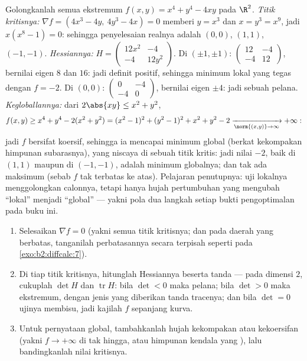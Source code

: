 \begin{example}\label{ex:b2:diffcalc:quarticrun}
Golongkanlah semua ekstremum $f(x, y) = x^4 + y^4 - 4xy$ pada $\R^2$.
\emph{Titik kritisnya:} $\nabla f = (4x^3 - 4y,\ 4y^3 - 4x) =
0$ memberi $y = x^3$ dan $x = y^3 = x^9$, jadi $x(x^8 - 1) = 0$:
sehingga penyelesaian realnya adalah $(0,0)$, $(1,1)$, $(-1,-1)$.
\emph{Hessiannya:} $H = \begin{pmatrix} 12x^2 & -4\\ -4 &
12y^2\end{pmatrix}$. Di $(\pm1, \pm1)$: $\begin{pmatrix} 12 &
-4\\ -4 & 12\end{pmatrix}$, bernilai eigen $8$ dan $16$: jadi
definit positif, sehingga minimum lokal yang tegas dengan $f = -2$. Di $(0,0)$:
$\begin{pmatrix} 0 & -4\\ -4 & 0\end{pmatrix}$, bernilai eigen
$\pm4$: jadi sebuah pelana. \emph{Kegloballannya:} dari $2\abs{xy} \leq x^2 +
y^2$,
\[
f(x, y) \geq x^4 + y^4 - 2(x^2 + y^2)
= (x^2 - 1)^2 + (y^2 - 1)^2 + x^2 + y^2 - 2
\xrightarrow[\norm{(x,y)}\to\infty]{} +\infty :
\]
jadi $f$ bersifat koersif, sehingga ia mencapai minimum global
(berkat kekompakan himpunan subarasnya), yang niscaya di sebuah titik
kritis: jadi nilai $-2$, baik di $(1,1)$ maupun di $(-1,-1)$, adalah
minimum globalnya; dan tak ada maksimum (sebab $f$ tak terbatas ke atas).
Pelajaran penutupnya: uji lokalnya menggolongkan calonnya, tetapi
hanya hujah pertumbuhan yang mengubah ``lokal'' menjadi ``global'' --- yakni
pola dua langkah setiap bukti pengoptimalan pada buku ini.
\end{example}

\begin{method}\label{met:b2:diffcalc:extrema}
\begin{enumerate}
  \item Selesaikan $\nabla f = 0$ (yakni semua titik kritisnya; dan pada daerah
        yang berbatas, tanganilah perbatasannya secara terpisah seperti pada
        \cref{exo:b2:diffcalc:7}).
  \item Di tiap titik kritisnya, hitunglah Hessiannya beserta
        tanda  --- pada dimensi $2$, cukuplah $\det H$
        dan $\operatorname{tr} H$: bila $\det < 0$ maka pelana; bila $\det >
        0$ maka ekstremum, dengan jenis yang diberikan tanda
        tracenya; dan bila $\det = 0$ ujinya membisu, jadi kajilah $f$
        sepanjang kurva.
  \item Untuk pernyataan global, tambahkanlah hujah kekompakan atau kekoersifan
        (yakni $f \to +\infty$ di tak hingga, atau himpunan kendala yang
        ), lalu bandingkanlah nilai kritisnya.
\end{enumerate}
\end{method}


